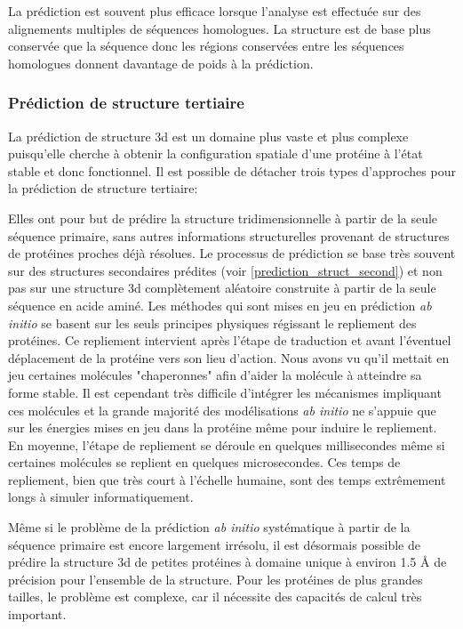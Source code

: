La prédiction est souvent plus efficace lorsque l'analyse est effectuée sur des alignements multiples de séquences homologues. La structure est de base plus conservée que la séquence donc les régions conservées entre les séquences homologues donnent davantage de poids à la prédiction.

\subsubsection{Prédiction de structure tertiaire} 

La prédiction de structure 3d est un domaine plus vaste et plus complexe puisqu'elle cherche à obtenir la configuration spatiale d'une protéine à l'état stable et donc fonctionnel. Il est possible de détacher trois types d'approches pour la prédiction de structure tertiaire:

 \label{ab_initio}

Elles ont pour but de prédire la structure tridimensionnelle à partir de la seule séquence primaire, sans autres informations structurelles provenant de structures de protéines proches déjà résolues. Le processus de prédiction se base très souvent sur des structures secondaires prédites (voir \ref{prediction_struct_second}) et non pas sur une structure 3d complètement aléatoire construite à partir de la seule séquence en acide aminé. 
Les méthodes qui sont mises en jeu en prédiction \textit{ab initio} se basent sur les seuls principes physiques régissant le repliement des protéines. Ce repliement intervient après l'étape de traduction et avant l'éventuel déplacement de la protéine vers son lieu d'action. Nous avons vu qu'il mettait en jeu certaines molécules "chaperonnes" afin d'aider la molécule à atteindre sa forme stable. Il est cependant très difficile d'intégrer les mécanismes impliquant ces molécules et la grande majorité des modélisations \textit{ab initio} ne s'appuie que sur les énergies mises en jeu dans la protéine même pour induire le repliement. En moyenne, l'étape de repliement se déroule en quelques millisecondes même si certaines molécules se replient en quelques microsecondes. Ces temps de repliement, bien que très court à l'échelle humaine, sont des temps extrêmement longs à simuler informatiquement.

Même si le problème de la prédiction \textit{ab initio} systématique à partir de la séquence primaire est encore largement irrésolu, il est désormais possible de prédire la structure 3d de petites protéines à domaine unique à environ 1.5 \r{A} de précision pour l'ensemble de la structure. Pour les protéines de plus grandes tailles, le problème est complexe, car il nécessite des capacités de calcul très important.

